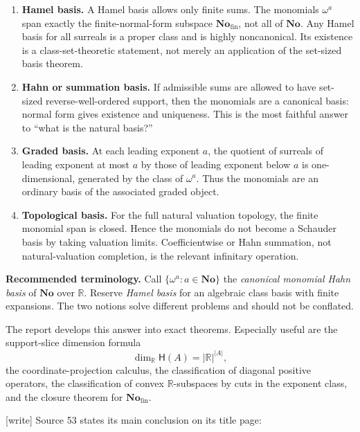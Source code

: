 \documentclass[11pt,letterpaper]{article}
\numberwithin{equation}{section}
\theoremstyle{definition}
\theoremstyle{remark}
\newcommand{\No}{\mathbf{No}}
\newcommand{\R}{\mathbb{R}}
\newcommand{\Hahn}{\mathsf{H}}
\newcommand{\Fin}{\No_{\mathrm{fin}}}
\newcommand{\wtag}{\textup{[write]}}%
\begin{document}
\begin{enumerate}[label=\textbf{\arabic*.},leftmargin=2.3em]
\item \textbf{Hamel basis.} A Hamel basis allows only finite sums. The monomials
$\omega^a$ span exactly the finite-normal-form subspace $\Fin$, not all of $\No$.
Any Hamel basis for all surreals is a proper class and is highly noncanonical.
Its existence is a class-set-theoretic statement, not merely an application of
the set-sized basis theorem.

\item \textbf{Hahn or summation basis.} If admissible sums are allowed to have
set-sized reverse-well-ordered support, then the monomials are a canonical basis:
normal form gives existence and uniqueness. This is the most faithful answer to
``what is the natural basis?''

\item \textbf{Graded basis.} At each leading exponent $a$, the quotient of
surreals of leading exponent at most $a$ by those of leading exponent below $a$
is one-dimensional, generated by the class of $\omega^a$. Thus the monomials are
an ordinary basis of the associated graded object.

\item \textbf{Topological basis.} For the full natural valuation topology, the
finite monomial span is closed. Hence the monomials do not become a Schauder basis
by taking valuation limits. Coefficientwise or Hahn summation, not natural-valuation
completion, is the relevant infinitary operation.
\end{enumerate}

\begin{resultbox}
\textbf{Recommended terminology.}
Call $\{\omega^a:a\in\No\}$ the \emph{canonical monomial Hahn basis} of $\No$
over $\R$. Reserve \emph{Hamel basis} for an algebraic class basis with finite
expansions. The two notions solve different problems and should not be conflated.
\end{resultbox}

The report develops this answer into exact theorems. Especially useful are the
support-slice dimension formula
\[
  \dim_{\R}\Hahn(A)=|\R|^{|A|},
\]
the coordinate-projection calculus, the classification of diagonal positive
operators, the classification of convex $\R$-subspaces by cuts in the exponent
class, and the closure theorem for $\Fin$.

\noindent\wtag{} Source 53 states its main conclusion on its title page:
\end{document}
